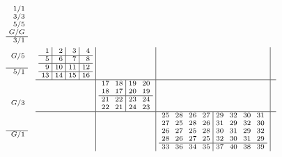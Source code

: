 \documentclass[12pt,a4paper]{amsart}
\begin{document}
\begin{align*}
  \scriptsize\arraycolsep3pt
  \begin{array}{r}
    1/1 \\ 3/3 \\ 5/5 \\ G/G \\\hline
    3/1 \\ \\ G/5 \\ \\\hline
    5/1 \\ \\ \\ \\ G/3 \\ \\ \\ \\\hline
    G/1 \\ \\ \\ \\ \\ \\ \\ \\
  \end{array}\quad
  \begin{array}{c|c|c|c}
  \begin{array}{r|r|r|r}
    1 & 2 & 3 & 4 \\\hline
    5 & 6 & 7 & 8 \\\hline
    9 & 10 & 11 & 12 \\\hline
    13 & 14 & 15 & 16
  \end{array}
  &&&\\\hline
      &
        \begin{array}{rr|rr}%
17&18&19&20\\%
18&17&20&19\\\hline
21&22&23&24\\%
22&21&24&23\\%
      \end{array}%
      &&\\\hline
    &&
\begin{array}{rrrr|rrrr}%
25&28&26&27&29&32&30&31\\%
27&25&28&26&31&29&32&30\\%
26&27&25&28&30&31&29&32\\%
28&26&27&25&32&30&31&29\\\hline
33&36&34&35&37&40&38&39\\%

\end{array}
\end{array}
\end{align*}
\end{document}
